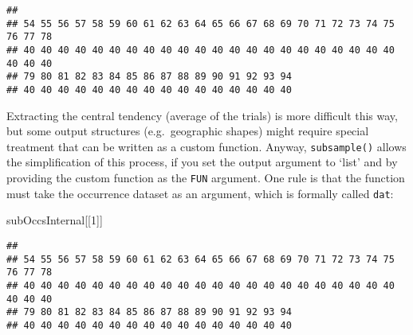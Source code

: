 \documentclass[]{article}
\newenvironment{Shaded}{\begin{snugshade}}{\end{snugshade}}
\newcommand{\ControlFlowTok}[1]{\textcolor[rgb]{0.13,0.29,0.53}{\textbf{#1}}}
\newcommand{\DataTypeTok}[1]{\textcolor[rgb]{0.13,0.29,0.53}{#1}}
\newcommand{\DecValTok}[1]{\textcolor[rgb]{0.00,0.00,0.81}{#1}}
\newcommand{\KeywordTok}[1]{\textcolor[rgb]{0.13,0.29,0.53}{\textbf{#1}}}
\newcommand{\NormalTok}[1]{#1}
\newcommand{\OperatorTok}[1]{\textcolor[rgb]{0.81,0.36,0.00}{\textbf{#1}}}
\newcommand{\StringTok}[1]{\textcolor[rgb]{0.31,0.60,0.02}{#1}}
\begin{document}
\begin{verbatim}
## 
## 54 55 56 57 58 59 60 61 62 63 64 65 66 67 68 69 70 71 72 73 74 75 76 77 78 
## 40 40 40 40 40 40 40 40 40 40 40 40 40 40 40 40 40 40 40 40 40 40 40 40 40 
## 79 80 81 82 83 84 85 86 87 88 89 90 91 92 93 94 
## 40 40 40 40 40 40 40 40 40 40 40 40 40 40 40 40
\end{verbatim}

Extracting the central tendency (average of the trials) is more
difficult this way, but some output structures (e.g.~geographic shapes)
might require special treatment that can be written as a custom
function. Anyway, \texttt{subsample()} allows the simplification of this
process, if you set the output argument to `list' and by providing the
custom function as the \texttt{FUN} argument. One rule is that the
function must take the occurrence dataset as an argument, which is
formally called \texttt{dat}:

\begin{Shaded}
\end{Shaded}

\begin{Shaded}
\begin{Highlighting}[]
\NormalTok{subOccsInternal[[}\DecValTok{1}\NormalTok{]]}
\end{Highlighting}
\end{Shaded}

\begin{verbatim}
## 
## 54 55 56 57 58 59 60 61 62 63 64 65 66 67 68 69 70 71 72 73 74 75 76 77 78 
## 40 40 40 40 40 40 40 40 40 40 40 40 40 40 40 40 40 40 40 40 40 40 40 40 40 
## 79 80 81 82 83 84 85 86 87 88 89 90 91 92 93 94 
## 40 40 40 40 40 40 40 40 40 40 40 40 40 40 40 40
\end{verbatim}
\end{document}
